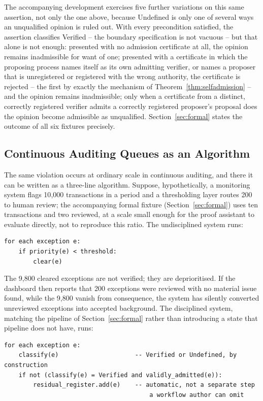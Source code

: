 \documentclass[smallcondensed,envcountsect,natbib]{svjour3}
\newcommand{\state}[1]{\textsf{#1}}
\begin{document}
The accompanying development exercises five further variations on this same assertion, not only the one above, because \state{Undefined} is only one of several ways an unqualified opinion is ruled out. With every precondition satisfied, the assertion classifies \state{Verified} -- the boundary specification is not vacuous -- but that alone is not enough: presented with no admission certificate at all, the opinion remains inadmissible for want of one; presented with a certificate in which the proposing process names itself as its own admitting verifier, or names a proposer that is unregistered or registered with the wrong authority, the certificate is rejected -- the first by exactly the mechanism of Theorem~\ref{thm:selfadmission} -- and the opinion remains inadmissible; only when a certificate from a distinct, correctly registered verifier admits a correctly registered proposer's proposal does the opinion become admissible as unqualified. Section~\ref{sec:formal} states the outcome of all six fixtures precisely.

\subsection{Continuous Auditing Queues as an Algorithm}
\label{sec:ca}

The same violation occurs at ordinary scale in continuous auditing, and there it can be written as a three-line algorithm. Suppose, hypothetically, a monitoring system flags 10{,}000 transactions in a period and a thresholding layer routes 200 to human review; the accompanying formal fixture (Section~\ref{sec:formal}) uses ten transactions and two reviewed, at a scale small enough for the proof assistant to evaluate directly, not to reproduce this ratio. The undisciplined system runs:

\begin{lstlisting}
for each exception e:
    if priority(e) < threshold:
        clear(e)
\end{lstlisting}

The 9{,}800 cleared exceptions are not verified; they are deprioritised. If the dashboard then reports that 200 exceptions were reviewed with no material issue found, while the 9{,}800 vanish from consequence, the system has silently converted unreviewed exceptions into accepted background. The disciplined system, matching the pipeline of Section~\ref{sec:formal} rather than introducing a state that pipeline does not have, runs:

\begin{lstlisting}
for each exception e:
    classify(e)                     -- Verified or Undefined, by construction
    if not (classify(e) = Verified and validly_admitted(e)):
        residual_register.add(e)    -- automatic, not a separate step
                                        a workflow author can omit
\end{lstlisting}
\end{document}
